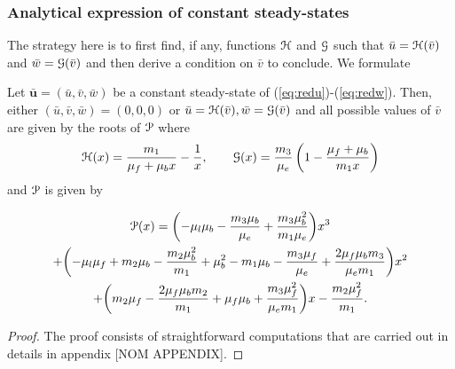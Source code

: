 \subsubsection{Analytical expression of constant steady-states}

The strategy here is to first find, if any, functions $\EuScript{H}$ and $\EuScript{G}$ such that $\bar u = \EuScript{H}(\bar v)$ and $\bar w = \EuScript{G}(\bar v)$ and then derive a condition on $\bar v$ to conclude. We formulate



\begin{proposition}
	Let $\bar{\bm u} = (\bar u, \bar v, \bar w)$ be a constant steady-state of (\ref{eq:redu})-(\ref{eq:redw}). Then, either $ (\bar u, \bar v, \bar w) = (0, 0, 0)$ or $\bar u = \EuScript{H}(\bar v), \bar w = \EuScript{G}(\bar v)$
	and all possible values of $\bar v$ are given by the roots of $\EuScript{P}$ where
	$$\EuScript{H}(x) = \frac{m_1}{\mu_f + \mu_b x} - \frac{1}{x}, \qquad \EuScript{G}(x) = \frac{m_3}{\mu_e}\left( 1 - \frac{\mu_f+ \mu_b }{m_1 x} \right)$$
	and  $\EuScript{P}$ is given by
	
	\begin{multline}
		\EuScript{P}{(x)} = \biggl(-\mu_l \mu_b - \frac{m_3 \mu_b}{\mu_e} + \frac{m_3 \mu_b^2}{m_1 \mu_e}\biggr)x^3 \\+ \biggl(-\mu_l\mu_f + m_2\mu_b - \frac{m_2 \mu_b^2}{m_1} +\mu_b^2 - m_1\mu_b - \frac{m_3 \mu_f}{\mu_e} + \frac{2 \mu_f\mu_b m_3}{\mu_e m_1}\biggr)x^2 \\ + \biggl(m_2\mu_f - \frac{2\mu_f\mu_b m_2}{m_1} + \mu_f\mu_b + \frac{m_3 \mu_f^2}{\mu_e m_1}\biggr)x -\frac{m_2\mu_f^2}{m_1}.
	\end{multline}
\end{proposition}
\begin{proof}
	The proof consists of straightforward computations that are carried out in details in appendix [NOM APPENDIX].
\end{proof}

